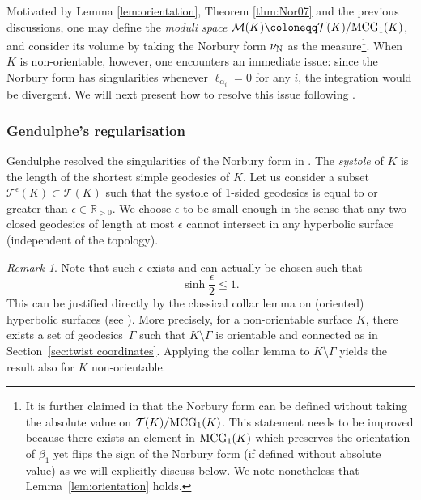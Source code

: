 \documentclass[12pt]{amsart}
\theoremstyle{plain}
\theoremstyle{definition}
\theoremstyle{remark}
\newtheorem{remark}[theorem]{Remark}
\numberwithin{equation}{section}
\begin{document}
Motivated by Lemma \ref{lem:orientation}, Theorem \ref{thm:Nor07} and the previous discussions, one may define the \emph{moduli space} $\mathcal{M}(K)\coloneqq\mathcal{T}(K)/{\rm MCG}_1(K)$, and consider its volume by taking the Norbury form $\nu_{{\rm N}}$ as the measure\footnote{It is further claimed in \cite{Nor07} that the Norbury form can be defined without taking the absolute value on $\mathcal{T}(K)/{\rm MCG}_1(K)$. This statement needs to be improved because there exists an element in ${\rm MCG}_1(K)$ which preserves the orientation of $\beta_1$ yet flips the sign of the Norbury form (if defined without absolute value) as we will explicitly discuss below. We note nonetheless that Lemma~\ref{lem:orientation} holds.}. When $K$ is non-orientable, however, one encounters an immediate issue: since the Norbury form has singularities whenever $\ell_{\alpha_i}=0$ for any $i$, the integration would be divergent.
We will next present how to resolve this issue following \cite{Gen17}.





\subsubsection{Gendulphe's regularisation}\label{sec:reg}



Gendulphe resolved the singularities of the Norbury form in \cite{Gen17}. The \emph{systole} of $K$ is the length of the shortest simple geodesics of $K$. Let us consider a subset $\mathcal{T}^{\epsilon}(K)\subset \mathcal{T}(K)$ such that the systole of 1-sided geodesics is equal to or greater than $\epsilon\in\mathbb{R}_{>0}$. We choose $\epsilon$ to be small enough in the sense that any two closed geodesics of length at most $\epsilon$ cannot intersect in any hyperbolic surface (independent of the topology).

\begin{remark}\label{rem:small epsilon}
Note that such $\epsilon$ exists and can actually be chosen such that
\begin{equation*}
\sinh\frac{\epsilon}{2}\leq 1.
\end{equation*}
This can be justified directly by the classical collar lemma on (oriented) hyperbolic surfaces (see \cite[Chapter 4]{Bus10}). More precisely, for a non-orientable surface $K$, there exists a set of geodesics~$\Gamma$ such that $K\setminus \Gamma$ is orientable and connected as in Section~\ref{sec:twist coordinates}. Applying the collar lemma to $K\setminus \Gamma$ yields the result also for $K$ non-orientable.

\end{remark}
\end{document}
